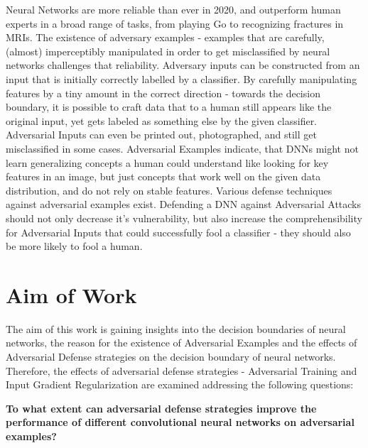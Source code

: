 \documentclass[draft,final]{vutinfth} %
\begin{document}
Neural Networks are more reliable than ever in 2020, and outperform human experts in a broad range of tasks, from playing Go to recognizing fractures in MRIs.
The existence of adversary examples - examples that are carefully, (almost) imperceptibly manipulated in order to get misclassified by neural networks challenges that reliability.
Adversary inputs can be constructed from an input that is initially correctly labelled by a classifier.
By carefully manipulating features by a tiny amount in the correct direction - towards the decision boundary, it is possible to
craft data that to a human still appears like the original input, yet gets labeled as something else by the given classifier.
Adversarial Inputs can even be printed out, photographed, and still get misclassified in some cases.
Adversarial Examples indicate, that DNNs might not learn generalizing concepts a human could understand like looking for key features in an image, but just concepts that work well on the given data distribution, and do not rely on stable features.
Various defense techniques against adversarial examples exist.
Defending a DNN against Adversarial Attacks should not only decrease it's vulnerability, but also increase the comprehensibility for Adversarial Inputs that could successfully fool a classifier - they should also be more likely to fool a human.

\section{Aim of Work}

The aim of this work is gaining insights into the decision boundaries of neural networks, the reason for the existence of Adversarial Examples and the effects of Adversarial Defense strategies on the decision boundary of neural networks.
Therefore, the effects of adversarial defense strategies - Adversarial Training and Input Gradient Regularization are examined addressing the following questions: 

\clearpage

\textbf{To what extent can adversarial defense strategies improve the performance of different convolutional neural networks on adversarial examples?} \\
\end{document}
